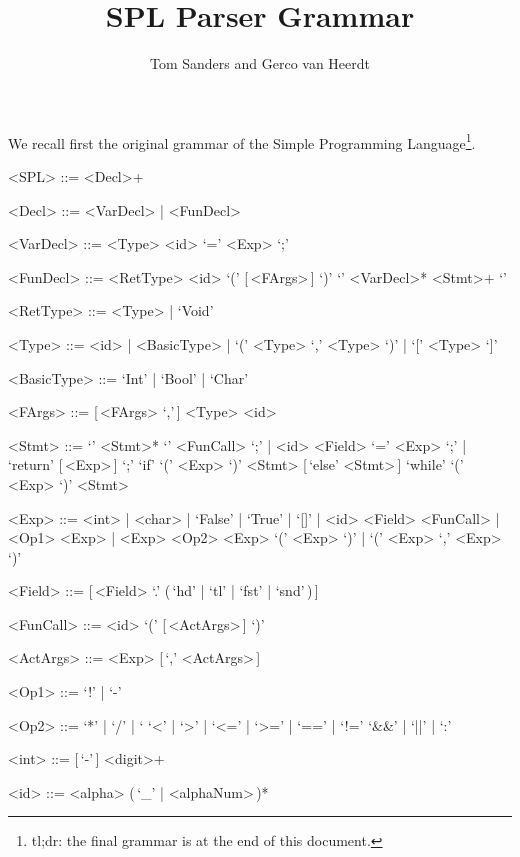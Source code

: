 \documentclass{article}
\title{SPL Parser Grammar}
\author{Tom Sanders and Gerco van Heerdt}
\begin{document}
\maketitle

We recall first the original grammar of the Simple Programming Language\footnote{%
    tl;dr: the final grammar is at the end of this document.
}.
\setlength{\grammarindent}{6.8em}
\begin{grammar}
    <SPL> ::= <Decl>+

    <Decl> ::= <VarDecl> | <FunDecl>

    <VarDecl> ::= <Type> <id> `=' <Exp> `;'

    <FunDecl> ::= <RetType> <id> `(' [\,<FArgs>\,] `)' `{' <VarDecl>* <Stmt>+ `}'

    <RetType> ::= <Type> | `Void'

    <Type> ::= <id> | <BasicType> | `(' <Type> `,' <Type> `)' | `[' <Type> `]'

    <BasicType> ::= `Int' | `Bool' | `Char'

    <FArgs> ::= [\,<FArgs> `,'\,] <Type> <id>

    <Stmt> ::= `{' <Stmt>* `}'
    \alt <FunCall> `;' | <id> <Field> `=' <Exp> `;' | `return' [\,<Exp>\,] `;'
    \alt `if' `(' <Exp> `)' <Stmt> [\,`else' <Stmt>\,]
    \alt `while' `(' <Exp> `)' <Stmt>

    <Exp> ::= <int> | <char> | `False' | `True' | `[]' | <id> <Field>
    \alt <FunCall> | <Op1> <Exp> | <Exp> <Op2> <Exp>
    \alt `(' <Exp> `)' | `(' <Exp> `,' <Exp> `)'

    <Field> ::= [\,<Field> `.' (\,`hd' | `tl' | `fst' | `snd'\,)\,]

    <FunCall> ::= <id> `(' [\,<ActArgs>\,] `)'

    <ActArgs> ::= <Exp> [\,`,' <ActArgs>\,]

    <Op1> ::= `!' | `-'

    <Op2> ::=  `*' | `/' | `%
    \alt `<' | `>' | `<=' | `>=' | `==' | `!='
    \alt `&&' | `||' | `:'

    <int> ::= [\,`-'\,] <digit>+

    <id> ::= <alpha> (\,`_' | <alphaNum>\,)*
\end{grammar}
\end{document}
